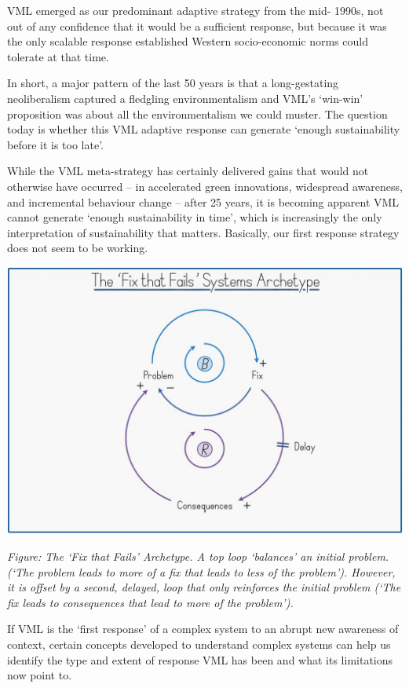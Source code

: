 \documentclass[
]{book}
\begin{document}
VML emerged as our predominant adaptive strategy from the mid-
1990s, not out of any confidence that it would be a sufficient response, but because it was the only
scalable response established Western socio-economic norms could tolerate at that time.

In short, a major pattern of the last 50 years is that a long-gestating neoliberalism captured a
fledgling environmentalism and VML's `win-win' proposition was about all the environmentalism we
could muster. The question today is whether this VML adaptive response can generate `enough
sustainability before it is too late'.

While the VML meta-strategy has certainly delivered gains that would not otherwise have occurred --
in accelerated green innovations, widespread awareness, and incremental behaviour change -- after
25 years, it is becoming apparent VML cannot generate `enough sustainability in time', which is
increasingly the only interpretation of sustainability that matters.
Basically, our first response strategy does not seem to be working.

\includegraphics{fig/austin_fix_fails.jpg}

\emph{Figure: The `Fix that Fails' Archetype. A top loop `balances' an initial problem.
(`The problem leads to more of a fix that leads to less of the problem'). However, it is
offset by a second, delayed, loop that only reinforces the initial problem (`The fix
leads to consequences that lead to more of the problem').}

If VML is the `first response' of a complex system to an abrupt new awareness of context, certain
concepts developed to understand complex systems can help us identify the type and extent of
response VML has been and what its limitations now point to.
\end{document}
